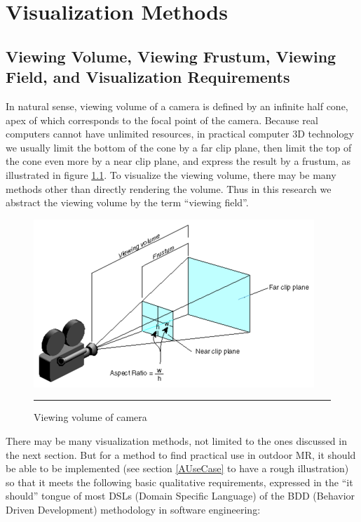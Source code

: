 \chapter{Visualization Methods}
\label{Chapter3}

\section{Viewing Volume, Viewing Frustum, Viewing Field, and Visualization Requirements}
\label{VisualizationRequirements}

In natural sense, viewing volume of a camera is defined by an infinite half cone, apex of which corresponds to the focal point of the camera. Because real computers cannot have unlimited resources, in practical computer 3D technology we usually limit the bottom of the cone by a far clip plane, then limit the top of the cone even more by a near clip plane, and express the result by a frustum, as illustrated in figure \ref{fig:ViewingVolume}. To visualize the viewing volume, there may be many methods other than directly rendering the volume. Thus in this research we abstract the viewing volume by the term ``viewing field''.

\begin{figure}[htbp]
	\centering
	\includegraphics{./Primitives/viewing_volume.png}
	\rule{35em}{0.5pt}
	\caption[Viewing volume of camera]{Viewing volume of camera}
	\label{fig:ViewingVolume}
\end{figure}

There may be many visualization methods, not limited to the ones discussed in the next section. But for a method to find practical use in outdoor MR, it should be able to be implemented (see section \ref{AUseCase} to have a rough illustration) so that it meets the following basic qualitative requirements, expressed in the ``it should'' tongue of most DSLs (Domain Specific Language) of the BDD (Behavior Driven Development) methodology in software engineering:

